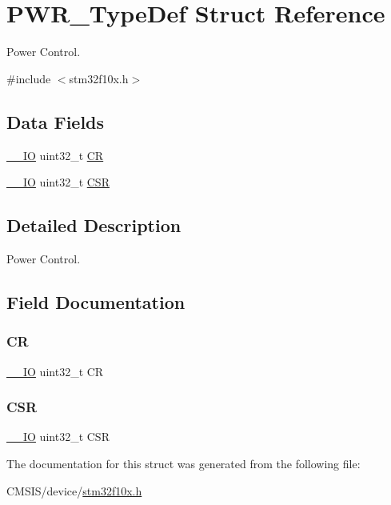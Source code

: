 \hypertarget{struct_p_w_r___type_def}{}\section{P\+W\+R\+\_\+\+Type\+Def Struct Reference}
\label{struct_p_w_r___type_def}


Power Control.  




{\ttfamily \#include $<$stm32f10x.\+h$>$}

\subsection*{Data Fields}
\begin{DoxyCompactItemize}
\item 
\mbox{\hyperlink{core__sc300_8h_aec43007d9998a0a0e01faede4133d6be}{\+\_\+\+\_\+\+IO}} uint32\+\_\+t \mbox{\hyperlink{struct_p_w_r___type_def_ab40c89c59391aaa9d9a8ec011dd0907a}{CR}}
\item 
\mbox{\hyperlink{core__sc300_8h_aec43007d9998a0a0e01faede4133d6be}{\+\_\+\+\_\+\+IO}} uint32\+\_\+t \mbox{\hyperlink{struct_p_w_r___type_def_a876dd0a8546697065f406b7543e27af2}{C\+SR}}
\end{DoxyCompactItemize}


\subsection{Detailed Description}
Power Control. 

\subsection{Field Documentation}
\mbox{\label{struct_p_w_r___type_def_ab40c89c59391aaa9d9a8ec011dd0907a}} 
\subsubsection{\texorpdfstring{CR}{CR}}
{\footnotesize\ttfamily \mbox{\hyperlink{core__sc300_8h_aec43007d9998a0a0e01faede4133d6be}{\+\_\+\+\_\+\+IO}} uint32\+\_\+t CR}

\mbox{\label{struct_p_w_r___type_def_a876dd0a8546697065f406b7543e27af2}} 
\subsubsection{\texorpdfstring{CSR}{CSR}}
{\footnotesize\ttfamily \mbox{\hyperlink{core__sc300_8h_aec43007d9998a0a0e01faede4133d6be}{\+\_\+\+\_\+\+IO}} uint32\+\_\+t C\+SR}



The documentation for this struct was generated from the following file\+:\begin{DoxyCompactItemize}
\item 
C\+M\+S\+I\+S/device/\mbox{\hyperlink{stm32f10x_8h}{stm32f10x.\+h}}\end{DoxyCompactItemize}
